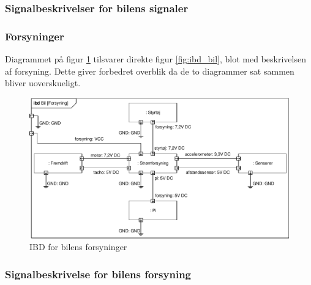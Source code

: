 \subsubsection{Signalbeskrivelser for bilens signaler}

\subsubsection{Forsyninger} %

Diagrammet på figur \ref{fig:ibd_bil_forsyning} tilsvarer direkte figur \ref{fig:ibd_bil}, blot med beskrivelsen af forsyning. Dette giver forbedret overblik da de to diagrammer sat sammen bliver uoverskueligt.  

\begin{figure}[h]
\centering
\includegraphics[width=\textwidth]{../fig/diagrammer/bil/ibd_bil_forsyning.pdf}
\caption{IBD for bilens forsyninger}
\label{fig:ibd_bil_forsyning}
\end{figure}

\subsubsection{Signalbeskrivelse for bilens forsyning}


